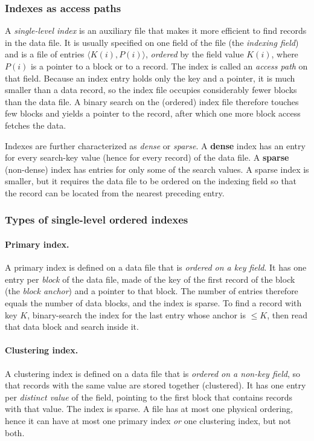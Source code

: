 \subsubsection{Indexes as access paths}
A \emph{single-level index} is an auxiliary file that makes it more efficient to find records in
the data file. It is usually specified on one field of the file (the \emph{indexing field}) and
is a file of entries $\langle K(i), P(i)\rangle$, \emph{ordered} by the field value $K(i)$, where
$P(i)$ is a pointer to a block or to a record. The index is called an \emph{access path} on that
field. Because an index entry holds only the key and a pointer, it is much smaller than a data
record, so the index file occupies considerably fewer blocks than the data file. A binary search
on the (ordered) index file therefore touches few blocks and yields a pointer to the record, after
which one more block access fetches the data.

Indexes are further characterized as \emph{dense} or \emph{sparse}. A \textbf{dense} index has an
entry for every search-key value (hence for every record) of the data file. A \textbf{sparse}
(non-dense) index has entries for only some of the search values. A sparse index is smaller, but it
requires the data file to be ordered on the indexing field so that the record can be located from
the nearest preceding entry.

\subsubsection{Types of single-level ordered indexes}
\label{sec:single-level}
\paragraph{Primary index.}
A primary index is defined on a data file that is \emph{ordered on a key field}. It has one entry
per \emph{block} of the data file, made of the key of the first record of the block (the
\emph{block anchor}) and a pointer to that block. The number of entries therefore equals the
number of data blocks, and the index is sparse. To find a record with key $K$, binary-search the
index for the last entry whose anchor is $\le K$, then read that data block and search inside it.

\paragraph{Clustering index.}
A clustering index is defined on a data file that is \emph{ordered on a non-key field}, so that
records with the same value are stored together (clustered). It has one entry per \emph{distinct
value} of the field, pointing to the first block that contains records with that value. The index
is sparse. A file has at most one physical ordering, hence it can have at most one primary index
\emph{or} one clustering index, but not both.

